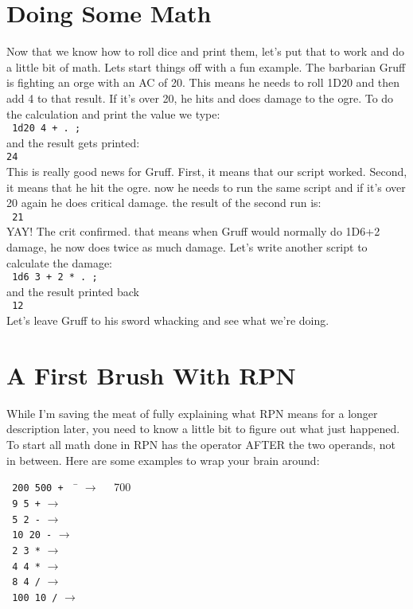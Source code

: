 \section{Doing Some Math}
\label{basicMath}
Now that we know how to roll dice and print them, let's put that to work and
do a little bit of math. Lets start things off with a fun example. The barbarian
Gruff is fighting an orge with an AC of 20. This means he needs to roll
1D20 and then add 4 to that result. If it's over 20, he hits and does damage to
the ogre. To do the calculation and print the value we type:\\
\indent\texttt{ 1d20 4 + . ;}\\
and the result gets printed:\\
\indent\texttt{24}\\
This is really good news for Gruff. First, it means that our script worked.
Second, it means that he hit the ogre. now he needs to run the same script and
if it's over 20 again he does critical damage. the result of the second run
is:\\
\indent\texttt{ 21}\\
YAY! The crit confirmed. that means when Gruff would normally do 1D6+2 damage,
he now does twice as much damage. Let's write another script to calculate the
damage:\\
\indent\texttt{ 1d6 3 + 2 * . ;}\\
and the result printed back\\
\indent\texttt{ 12}\\
Let's leave Gruff to his sword whacking and see what we're doing.

\section{A First Brush With RPN}
\label{firstRPN}
While I'm saving the meat of fully explaining what RPN means for a longer
description later, you need to know a little bit to figure out what just
happened. To start all math done in RPN has the operator AFTER the two
operands, not in between. Here are some examples to wrap your brain around:\\
\begin{tabbing}
\texttt{ 200 500 +} \ \ \= $\longrightarrow$ \ \ \= 700\\
\texttt{ 9 5 +} \> $\longrightarrow$ \\
\texttt{ 5 2 -} \> $\longrightarrow$ \\
\texttt{ 10 20 -} \> $\longrightarrow$ \\
\texttt{ 2 3 *} \> $\longrightarrow$ \\
\texttt{ 4 4 *} \> $\longrightarrow$ \\
\texttt{ 8 4 /} \> $\longrightarrow$ \\
\texttt{ 100 10 /} \> $\longrightarrow$ \\
\end{tabbing}

